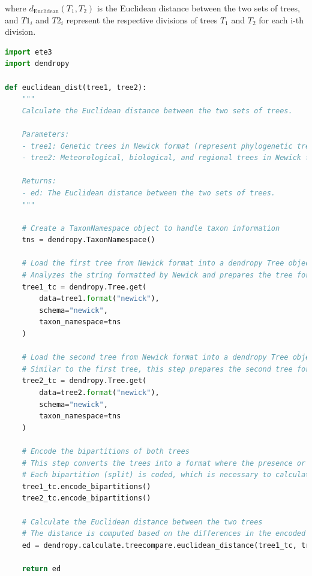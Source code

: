 {where $ d_{\text{Euclidean}}(T_1, T_2)$ is the Euclidean distance between the two sets of trees, and $T1_i$ and $T2_i$ represent the respective divisions of trees $T_1$ and $T_2$ for each i-th division.

\begin{lstlisting}[label=lst:euclideanDist,language=Python,caption=Python script for calculating the Euclidean distance using the ete3 and the dendropy packages in the aPhyloGeo package]
import ete3
import dendropy

def euclidean_dist(tree1, tree2):
    """
    Calculate the Euclidean distance between the two sets of trees.

    Parameters:
    - tree1: Genetic trees in Newick format (represent phylogenetic trees in text form).
    - tree2: Meteorological, biological, and regional trees in Newick format (represent attributes trees in text form).

    Returns:
    - ed: The Euclidean distance between the two sets of trees.
    """

    # Create a TaxonNamespace object to handle taxon information
    tns = dendropy.TaxonNamespace()

    # Load the first tree from Newick format into a dendropy Tree object
    # Analyzes the string formatted by Newick and prepares the tree for comparison.
    tree1_tc = dendropy.Tree.get(
        data=tree1.format("newick"), 
        schema="newick", 
        taxon_namespace=tns
    )
    
    # Load the second tree from Newick format into a dendropy Tree object
    # Similar to the first tree, this step prepares the second tree for comparison.
    tree2_tc = dendropy.Tree.get(
        data=tree2.format("newick"), 
        schema="newick", 
        taxon_namespace=tns
    )

    # Encode the bipartitions of both trees
    # This step converts the trees into a format where the presence or absence of 
    # Each bipartition (split) is coded, which is necessary to calculate distances.
    tree1_tc.encode_bipartitions()
    tree2_tc.encode_bipartitions()

    # Calculate the Euclidean distance between the two trees
    # The distance is computed based on the differences in the encoded bipartitions.
    ed = dendropy.calculate.treecompare.euclidean_distance(tree1_tc, tree2_tc)

    return ed
\end{lstlisting}

}
